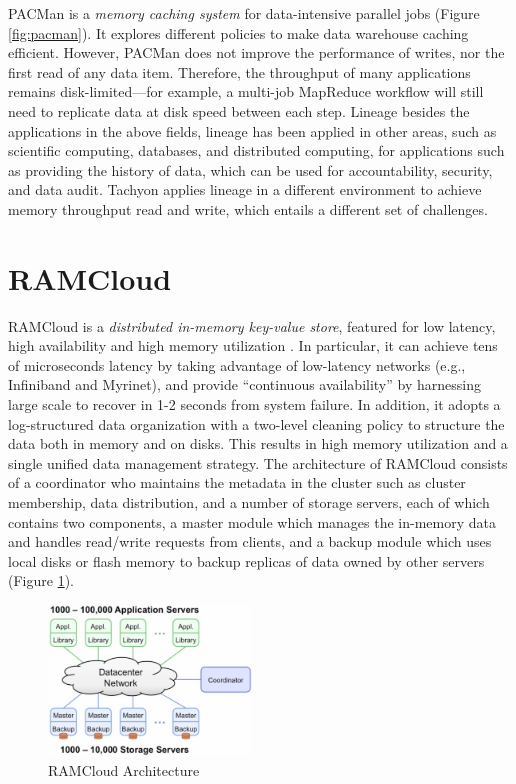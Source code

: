\documentclass[twocolumn]{article}
\begin{document}
PACMan \cite{Anan:2012} is a \textit{memory caching system} for data-intensive parallel jobs (Figure \ref{fig:pacman}). It explores different policies to make data warehouse caching efficient. However, PACMan does not improve the performance of writes, nor the first read of any data item. Therefore, the throughput of many applications remains disk-limited—for example, a multi-job MapReduce workflow will still need to replicate data at disk speed between each step.
Lineage besides the applications in the above fields, lineage has been applied in other areas, such as scientific computing, databases, and distributed computing, for applications such as providing the history of data, which can be used for accountability, security, and data audit. Tachyon applies lineage in a different environment to achieve memory throughput read and write, which entails a different set of challenges.


\section{RAMCloud}
RAMCloud is a \textit{distributed in-memory key-value store}, featured for low latency, high availability and high memory utilization \cite{Ousterhout:2015}. In particular, it can achieve tens of microseconds latency
by taking advantage of low-latency networks (e.g., Infiniband and
Myrinet), and provide ``continuous availability'' by harnessing large
scale to recover in 1-2 seconds from system failure. In addition, it
adopts a log-structured data organization with a two-level cleaning
policy to structure the data both in memory and on disks. This results
in high memory utilization and a single unified data management
strategy. The architecture of RAMCloud consists of a coordinator who
maintains the metadata in the cluster such as cluster membership, data
distribution, and a number of storage servers, each of which contains
two components, a master module which manages the in-memory data and
handles read/write requests from clients, and a backup module which uses
local disks or flash memory to backup replicas of data owned by other
servers (Figure \ref{fig:ramcloud_architecture}).

\begin{figure}[htb]
        \centering
        \includegraphics[width=0.48\textwidth]{architecture_ramcloud.png}
        \caption{RAMCloud Architecture}
        \label{fig:ramcloud_architecture}
\end{figure}
\end{document}
